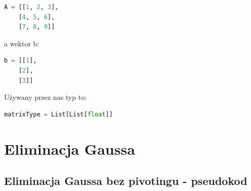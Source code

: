 \documentclass[a4paper]{article}
\begin{document}
\begin{lstlisting}[language=python]
A = [[1, 2, 3],
    [4, 5, 6],
    [7, 8, 9]]
\end{lstlisting}

a wektor b:
\begin{lstlisting}[language=python]
b = [[1],
    [2],
    [3]]
\end{lstlisting}

Używany przez nas typ to:
\begin{lstlisting}[language=python]
matrixType = List[List[float]]
\end{lstlisting}


\section{Eliminacja Gaussa}


\subsection{Eliminacja Gaussa bez pivotingu - pseudokod}
\end{document}
